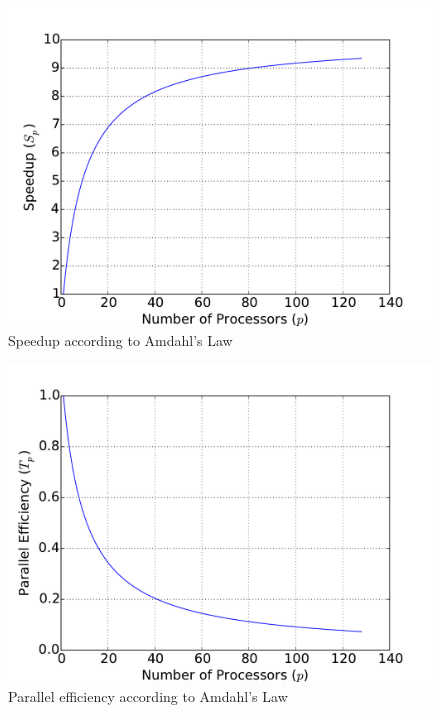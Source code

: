 \documentclass{hw}
\begin{document}
\begin{figure}[h]
  \centering
  \includegraphics[width=\textwidth]{speedup.pdf}
  \caption{Speedup according to Amdahl's Law}
  \label{fig:speedup}
\end{figure}
\begin{figure}[h]
  \centering
  \includegraphics[width=\textwidth]{efficiency.pdf}
  \caption{Parallel efficiency according to Amdahl's Law}
  \label{fig:efficiency}
\end{figure}
\end{document}
